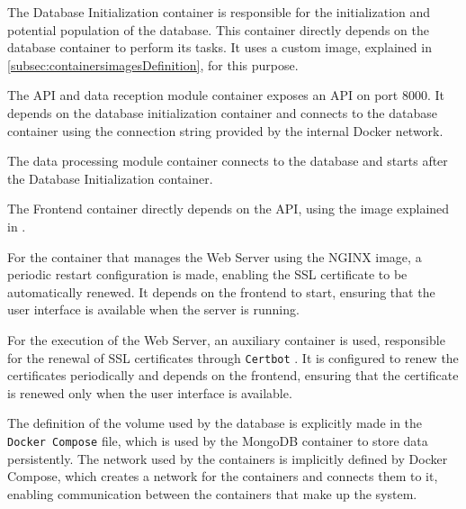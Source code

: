 The Database Initialization container is responsible for the initialization and potential population of the database. This container directly depends on the database container to perform its tasks. It uses a custom image, explained in \ref{subsec:containersimagesDefinition}, for this purpose.

The API and data reception module container exposes an API on port 8000. It depends on the database initialization container and connects to the database container using the connection string provided by the internal Docker network.

The data processing module container connects to the database and starts after the Database Initialization container.

The Frontend container directly depends on the API, using the image explained in \label{subsec:containersimages}.

For the container that manages the Web Server using the NGINX image, a periodic restart configuration is made, enabling the SSL certificate to be automatically renewed. It depends on the frontend to start, ensuring that the user interface is available when the server is running.

For the execution of the Web Server, an auxiliary container is used, responsible for the renewal of SSL certificates through \texttt{Certbot} \cite{dockerCertbot}. It is configured to renew the certificates periodically and depends on the frontend, ensuring that the certificate is renewed only when the user interface is available.

The definition of the volume used by the database is explicitly made in the \texttt{Docker Compose} file, which is used by the MongoDB container to store data persistently. The network used by the containers is implicitly defined by Docker Compose, which creates a network for the containers and connects them to it, enabling communication between the containers that make up the system.

